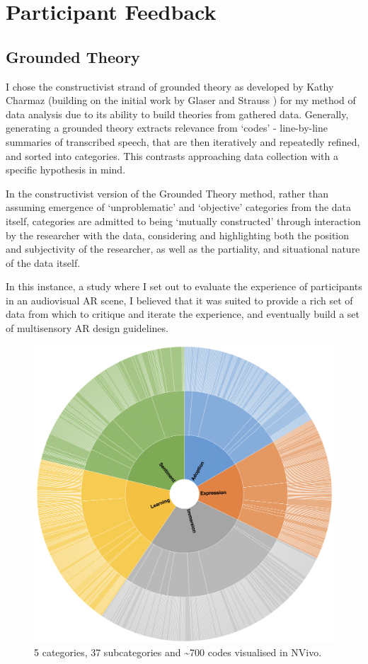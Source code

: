 \section{Participant Feedback}\label{sec: polaris-feedback}
\subsection{Grounded Theory}\label{sec: polaris-feedback-grounded}
I chose the constructivist strand of grounded theory as developed by Kathy Charmaz \citeyearpar{charmaz2006} (building on the initial work by Glaser and Strauss \citeyearpar{glaser1967}) for my method of data analysis due to its ability to build theories from gathered data. Generally, generating a grounded theory extracts relevance from ‘codes’ - line-by-line summaries of transcribed speech, that are then iteratively and repeatedly refined, and sorted into categories. This contrasts approaching data collection with a specific hypothesis in mind.

In the constructivist version of the Grounded Theory method, rather than assuming emergence of ‘unproblematic’ and ‘objective’ categories from the data itself, categories are admitted to being ‘mutually constructed’ through interaction by the researcher with the data, considering and highlighting both the position and subjectivity of the researcher, as well as the partiality, and situational nature of the data itself.

In this instance, a study where I set out to evaluate the experience of participants in an audiovisual AR scene, I believed that it was suited to provide a rich set of data from which to critique and iterate the experience, and eventually build a set of multisensory AR design guidelines.

\begin{figure}
    \centering
    \includegraphics[width=0.7\linewidth]{figures/06-polaris/polaris-feedback-grounded-codes.png}
    \caption{5 categories, 37 subcategories and \textasciitilde{}700 codes visualised in NVivo.}
    \label{fig: polaris-feedback-grounded-codes}
\end{figure}


